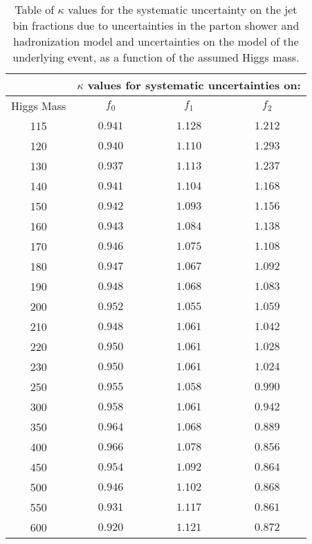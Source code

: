 \begin{table}[!htbp]
\begin{center}
\begin{tabular}{|c|c|c|c|}

\hline
               &   \multicolumn{3}{|c|}{ $\kappa$ values for systematic uncertainties on: } \\
\hline
Higgs Mass     &   $f_{0}$   &  $f_{1}$       &   $f_{2}$       \\
\hline
115 & $0.941$ & $1.128$ & $1.212$ \\
120 & $0.940$ & $1.110$ & $1.293$ \\
130 & $0.937$ & $1.113$ & $1.237$ \\
140 & $0.941$ & $1.104$ & $1.168$ \\
150 & $0.942$ & $1.093$ & $1.156$ \\
160 & $0.943$ & $1.084$ & $1.138$ \\
170 & $0.946$ & $1.075$ & $1.108$ \\
180 & $0.947$ & $1.067$ & $1.092$ \\
190 & $0.948$ & $1.068$ & $1.083$ \\
200 & $0.952$ & $1.055$ & $1.059$ \\
210 & $0.948$ & $1.061$ & $1.042$ \\
220 & $0.950$ & $1.061$ & $1.028$ \\
230 & $0.950$ & $1.061$ & $1.024$ \\
250 & $0.955$ & $1.058$ & $0.990$ \\
300 & $0.958$ & $1.061$ & $0.942$ \\
350 & $0.964$ & $1.068$ & $0.889$ \\
400 & $0.966$ & $1.078$ & $0.856$ \\
450 & $0.954$ & $1.092$ & $0.864$ \\
500 & $0.946$ & $1.102$ & $0.868$ \\
550 & $0.931$ & $1.117$ & $0.861$ \\
600 & $0.920$ & $1.121$ & $0.872$ \\


\hline
\end{tabular}
\caption{Table of $\kappa$ values for the systematic uncertainty on the jet bin fractions
due to  uncertainties in the parton shower and hadronization model and uncertainties
on the model of the underlying event, as a function of the assumed Higgs mass.  }
\label{tab:JetBinFractionSystematics_PartonShower}
\end{center}
\end{table}



